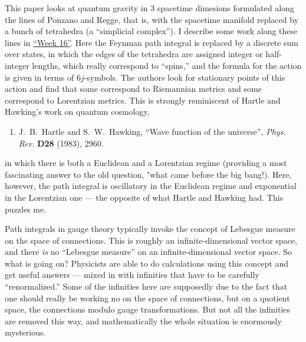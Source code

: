 \documentclass{article}
\def\tightlist{}
\renewcommand{\texttt}[1]{%
  \begingroup
  \ttfamily
  \begingroup\lccode`~=`/\lowercase{\endgroup\def~}{/\discretionary{}{}{}}%
  \begingroup\lccode`~=`[\lowercase{\endgroup\def~}{[\discretionary{}{}{}}%
  \begingroup\lccode`~=`.\lowercase{\endgroup\def~}{.\discretionary{}{}{}}%
  \catcode`/=\active\catcode`[=\active\catcode`.=\active
  \scantokens{#1\noexpand}%
  \endgroup
}
\begin{document}
This paper looks at quantum gravity in 3 spacetime dimesions formulated
along the lines of Ponzano and Regge, that is, with the spacetime
manifold replaced by a bunch of tetrahedra (a ``simplicial complex''). I
describe some work along these lines in
\protect\hyperlink{week16}{``Week 16''}. Here the Feynman path integral
is replaced by a discrete sum over states, in which the edges of the
tetrahedra are assigned integer or half-integer lengths, which really
correspond to ``spins,'' and the formula for the action is given in
terms of \(6j\)-symbols. The authors look for stationary points of this
action and find that some correspond to Riemannian metrics and some
correspond to Lorentzian metrics. This is strongly reminiscent of Hartle
and Hawking's work on quantum cosmology,

\begin{enumerate}
\def\labelenumi{\arabic{enumi})}
\setcounter{enumi}{3}
\tightlist
\item
     J.\ B.\ Hartle and S.\ W.\ Hawking,
  ``Wave function of the universe'',
  \emph{Phys. Rev.} \textbf{D28} (1983), 2960.
\end{enumerate}

\noindent
in which there is both a Euclidean and a Lorentzian regime (providing a
most fascinating answer to the old question, "what came before the big
bang!). Here, however, the path integral is oscillatory in the Euclidean
regime and exponential in the Lorentzian one --- the opposite of what
Hartle and Hawking had. This puzzles me.


Path integrals in gauge theory typically invoke the concept of Lebesgue
measure on the space of connections. This is roughly an
infinite-dimensional vector space, and there \emph{is} no ``Lebesgue
measure'' on an infinite-dimensional vector space. So what is going on?
Physicists are able to do calculations using this concept and get useful
answers --- mixed in with infinities that have to be carefully
``renormalized.'' Some of the infinities here are supposedly due to the
fact that one should really be working no on the space of connections,
but on a quotient space, the connections modulo gauge transformations.
But not all the infinities are removed this way, and mathematically the
whole situation is enormously mysterious.
\end{document}
